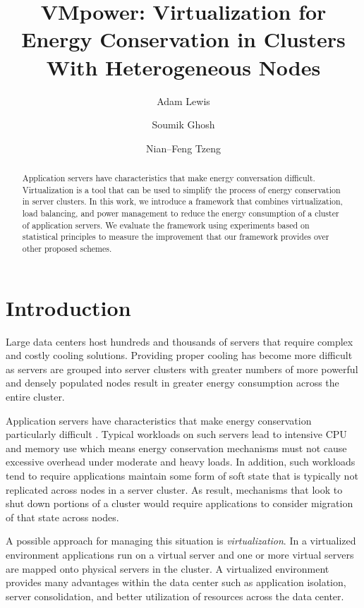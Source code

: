 \documentclass[times, 10pt,twocolumn]{article}
\begin{document}
\title{VMpower: Virtualization for Energy Conservation in Clusters With
  Heterogeneous Nodes}
\author[*]{Adam Lewis}
\author[*]{Soumik Ghosh}
\author[*]{Nian--Feng Tzeng}
\maketitle
\thispagestyle{empty}
\begin{abstract}
Application servers have characteristics that make energy conversation
difficult.  Virtualization is a tool that can be used to simplify the process
of energy conservation in server clusters.   In this work, we introduce a
framework that combines virtualization, load balancing, and power management
to reduce the energy consumption of a cluster of application servers.   We
evaluate the framework using experiments based on statistical principles to
measure the improvement that our framework provides over other proposed schemes.
\end{abstract}
\section{Introduction}
\label{introduction}
Large data centers host hundreds and thousands of servers that require complex
and costly cooling solutions.  Providing proper cooling has become more
difficult as servers are grouped into server clusters with greater numbers of
more powerful and densely populated nodes result in greater energy consumption
across the entire cluster.

Application servers have characteristics that make energy conservation
particularly difficult \cite{Bianchini2004}.  Typical workloads on such
servers lead to intensive CPU and memory use which means energy conservation
mechanisms must not cause excessive overhead under moderate and heavy loads.
In addition, such workloads tend to require applications maintain some form of
soft state that is typically not replicated across nodes in a server
cluster. As result, mechanisms that look to shut down portions of a cluster
would require applications to consider migration of that state across nodes.

A possible approach for managing this situation is \textit{virtualization}.
In a virtualized environment applications run on a virtual server and one or
more virtual servers are mapped onto physical servers in the cluster.  A
virtualized environment provides many advantages within the data center such
as application isolation, server consolidation, and better utilization of
resources across the data center.
\end{document}
